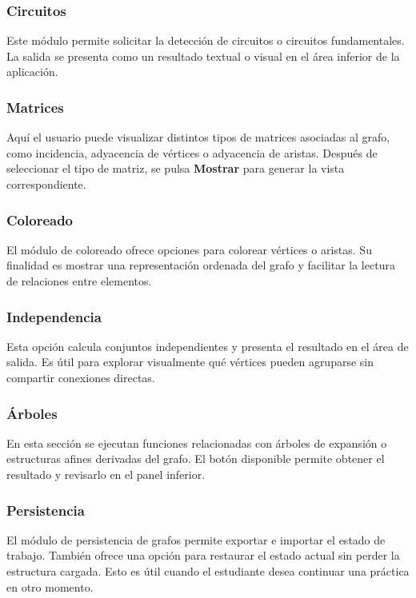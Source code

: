 \documentclass[10pt,onecolumn]{IEEEtran}
\begin{document}
\subsubsection{Circuitos}
Este módulo permite solicitar la detección de circuitos o circuitos fundamentales. La salida se presenta como un resultado textual o visual en el área inferior de la aplicación.

\subsubsection{Matrices}
Aquí el usuario puede visualizar distintos tipos de matrices asociadas al grafo, como incidencia, adyacencia de vértices o adyacencia de aristas. Después de seleccionar el tipo de matriz, se pulsa \textbf{Mostrar} para generar la vista correspondiente.

\subsubsection{Coloreado}
El módulo de coloreado ofrece opciones para colorear vértices o aristas. Su finalidad es mostrar una representación ordenada del grafo y facilitar la lectura de relaciones entre elementos.

\subsubsection{Independencia}
Esta opción calcula conjuntos independientes y presenta el resultado en el área de salida. Es útil para explorar visualmente qué vértices pueden agruparse sin compartir conexiones directas.

\subsubsection{Árboles}
En esta sección se ejecutan funciones relacionadas con árboles de expansión o estructuras afines derivadas del grafo. El botón disponible permite obtener el resultado y revisarlo en el panel inferior.

\subsubsection{Persistencia}
El módulo de persistencia de grafos permite exportar e importar el estado de trabajo. También ofrece una opción para restaurar el estado actual sin perder la estructura cargada. Esto es útil cuando el estudiante desea continuar una práctica en otro momento.
\end{document}
